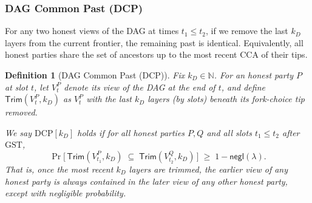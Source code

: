 \documentclass[11pt]{article}
\newtheorem{definition}[theorem]{Definition}
\newcommand{\negl}{\ensuremath{\mathsf{negl}}\xspace}
\begin{document}
\subsubsection{DAG Common Past (DCP)}

For any two honest views of the DAG at times $t_1\le t_2$, if we remove the last $k_D$ layers from the current frontier, the remaining past is identical. Equivalently, all honest parties share the set of ancestors up to the most recent CCA of their tips.




\begin{definition}[DAG Common Past (DCP)]
Fix $k_D \in \mathbb{N}$. For an honest party $P$ at slot $t$, let $V_t^P$ denote
its view of the DAG at the end of $t$, and define
$\mathsf{Trim}(V_t^P,k_D)$ as $V_t^P$ with the last $k_D$ layers (by slots)
beneath its fork-choice tip removed.

We say $\mathrm{DCP}[k_D]$ holds if for all honest parties $P,Q$ and all slots
$t_1 \le t_2$ after $\mathrm{GST}$,
\[
\Pr\!\Big[\, \mathsf{Trim}(V_{t_1}^P,k_D)\;\subseteq\;\mathsf{Trim}(V_{t_2}^Q,k_D)\,\Big]
\;\ge\; 1-\negl(\lambda).
\]
That is, once the most recent $k_D$ layers are trimmed, the earlier view of
any honest party is always contained in the later view of any other honest party,
except with negligible probability.
\end{definition}
\end{document}
